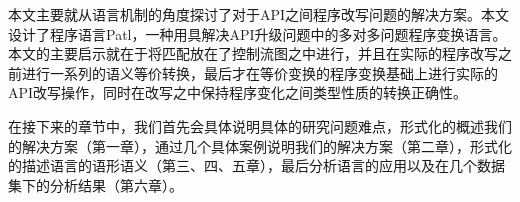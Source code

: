 本文主要就从语言机制的角度探讨了对于API之间程序改写问题的解决方案。本文设计了程序语言Patl，一种用具解决API升级问题中的多对多问题程序变换语言。本文的主要启示就在于将匹配放在了控制流图之中进行，并且在实际的程序改写之前进行一系列的语义等价转换，最后才在等价变换的程序变换基础上进行实际的API改写操作，同时在改写之中保持程序变化之间类型性质的转换正确性。

在接下来的章节中，我们首先会具体说明具体的研究问题难点，形式化的概述我们的解决方案（第一章），通过几个具体案例说明我们的解决方案（第二章），形式化的描述语言的语形语义（第三、四、五章），最后分析语言的应用以及在几个数据集下的分析结果（第六章）。

